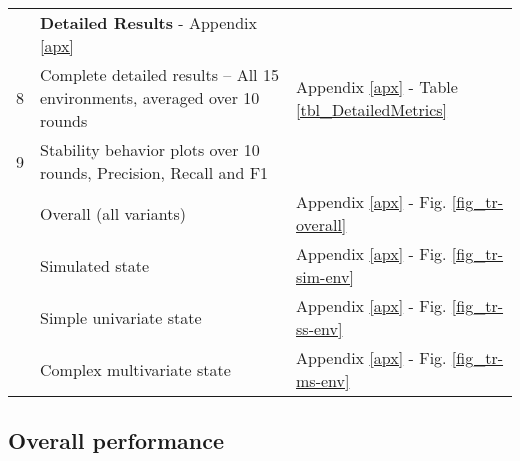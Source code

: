 \documentclass[referee, sn-mathphys-num]{sn-jnl}
\newcommand{\rowspace}[1]{\renewcommand{\arraystretch}{#1}}
\newcommand{\ltmidrule} {\arrayrulecolor{black!20} \midrule}
\begin{document}
\begin{table}
{\begin{tabular}{R{0.25cm} L{11.5cm} L{3cm}}
				 & \textbf{Detailed Results} - Appendix \ref{apx} & \\
				8 & Complete detailed results -- All 15 environments, averaged over 10 rounds & Appendix \ref{apx} - Table \ref{tbl_DetailedMetrics}\\\ltmidrule
				
				9 & Stability behavior plots over 10 rounds, Precision, Recall and F1\\
				& \quad\quad Overall (all variants)  & Appendix \ref{apx} - Fig. \ref{fig_tr-overall}\\
				& \quad\quad Simulated state & Appendix \ref{apx} - Fig. \ref{fig_tr-sim-env}\\
				& \quad\quad Simple univariate state & Appendix \ref{apx} - Fig. \ref{fig_tr-ss-env}\\
				& \quad\quad Complex multivariate state & Appendix \ref{apx} - Fig. \ref{fig_tr-ms-env}\\
				\bottomrule
		\end{tabular}}
		\label{tbl_ref-results}
	\end{table}
	
	\subsection{Overall performance}
%				
%				
%				
		
\end{document}
